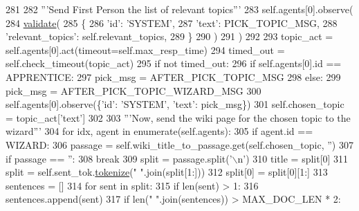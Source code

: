 \begin{DoxyCode}
281 
282             \textcolor{stringliteral}{'''Send First Person the list of relevant topics'''}
283             self.agents[0].observe(
284                 \hyperlink{namespaceparlai_1_1core_1_1worlds_afc3fad603b7bce41dbdc9cdc04a9c794}{validate}(
285                     \{
286                         \textcolor{stringliteral}{'id'}: \textcolor{stringliteral}{'SYSTEM'},
287                         \textcolor{stringliteral}{'text'}: PICK\_TOPIC\_MSG,
288                         \textcolor{stringliteral}{'relevant\_topics'}: self.relevant\_topics,
289                     \}
290                 )
291             )
292 
293             topic\_act = self.agents[0].act(timeout=self.max\_resp\_time)
294             timed\_out = self.check\_timeout(topic\_act)
295             \textcolor{keywordflow}{if} \textcolor{keywordflow}{not} timed\_out:
296                 \textcolor{keywordflow}{if} self.agents[0].id == APPRENTICE:
297                     pick\_msg = AFTER\_PICK\_TOPIC\_MSG
298                 \textcolor{keywordflow}{else}:
299                     pick\_msg = AFTER\_PICK\_TOPIC\_WIZARD\_MSG
300                 self.agents[0].observe(\{\textcolor{stringliteral}{'id'}: \textcolor{stringliteral}{'SYSTEM'}, \textcolor{stringliteral}{'text'}: pick\_msg\})
301             self.chosen\_topic = topic\_act[\textcolor{stringliteral}{'text'}]
302 
303             \textcolor{stringliteral}{'''Now, send the wiki page for the chosen topic to the wizard'''}
304             \textcolor{keywordflow}{for} idx, agent \textcolor{keywordflow}{in} enumerate(self.agents):
305                 \textcolor{keywordflow}{if} agent.id == WIZARD:
306                     passage = self.wiki\_title\_to\_passage.get(self.chosen\_topic, \textcolor{stringliteral}{''})
307                     \textcolor{keywordflow}{if} passage == \textcolor{stringliteral}{''}:
308                         \textcolor{keywordflow}{break}
309                     split = passage.split(\textcolor{stringliteral}{'\(\backslash\)n'})
310                     title = split[0]
311                     split = self.sent\_tok.\hyperlink{namespaceparlai_1_1agents_1_1tfidf__retriever_1_1build__tfidf_a1fdb457e98eb4e4c26047e229686a616}{tokenize}(\textcolor{stringliteral}{" "}.join(split[1:]))
312                     split[0] = split[0][1:]
313                     sentences = []
314                     \textcolor{keywordflow}{for} sent \textcolor{keywordflow}{in} split:
315                         \textcolor{keywordflow}{if} len(sent) > 1:
316                             sentences.append(sent)
317                             \textcolor{keywordflow}{if} len(\textcolor{stringliteral}{" "}.join(sentences)) > MAX\_DOC\_LEN * 2:

\end{DoxyCode}
